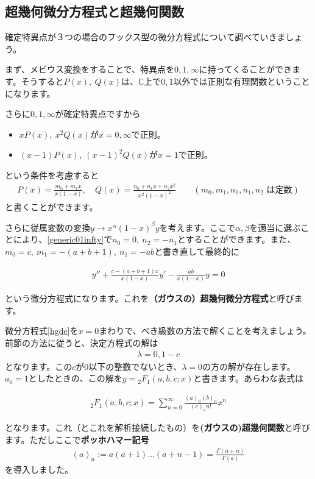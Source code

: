 \documentclass[report,paper=a4, fontsize=12pt, line_length=16cm, number_of_lines=33,dvipdfmx]{jlreq}
\newenvironment{important}{\begin{tcolorbox}[
  colback = white,
  colframe = red!35,
  boxrule = 2mm,
  fonttitle = \bfseries,
  after = \noindent] }{\end{tcolorbox}}
\numberwithin{equation}{section}
\newcommand{\Cb}{\mathbb{C}}
\newcommand{\strong}[1]{\textsf{\bfseries #1}}
\newcommand{\HG}{{}_2F_1}
\begin{document}
\subsection{超幾何微分方程式と超幾何関数}
確定特異点が３つの場合のフックス型の微分方程式について調べていきましょう。

まず、メビウス変換をすることで、特異点を$0,1,\infty$に持ってくることができます。そうすると$P(x),\ Q(x)$は、$\Cb$上で$0,1$以外では正則な有理関数ということになります。

さらに$0,1,\infty$が確定特異点ですから
\begin{itemize}
  \item $xP(x),\ x^2 Q(x)$が$x=0,\infty$で正則。
  \item $(x-1)P(x),\ (x-1)^2Q(x)$が$x=1$で正則。
\end{itemize}
という条件を考慮すると
\begin{align}
  P(x)=\frac{m_0+m_1 x}{x(1-x)},\quad
  Q(x)=\frac{n_0+n_1x+n_2 x^2}{x^2(1-x)^2}
  \qquad (m_0,m_1,n_0,n_1,n_2 \text{ は定数})\label{generic01infty}
\end{align}
と書くことができます。

さらに従属変数の変換$y\to x^{\alpha}(1-x)^{\beta}y$を考えます。ここで$\alpha,\beta$を適当に選ぶことにより、\eqref{generic01infty}で$n_0=0,\ n_2=-n_1$とすることができます。また、$m_0=c,\ m_1=-(a+b+1),\ n_1=-ab$と書き直して最終的に
\begin{important}
  \begin{align}
    y''+\frac{c-(a+b+1)x}{x(1-x)}y'-\frac{ab}{x(1-x)}y=0\label{hgde}
  \end{align}    
\end{important}
という微分方程式になります。これを\strong{（ガウスの）超幾何微分方程式}と呼びます。

微分方程式\eqref{hgde}を$x=0$まわりで、べき級数の方法で解くことを考えましょう。前節の方法に従うと、決定方程式の解は
\begin{align}
  \lambda=0,1-c
\end{align}
となります。この$c$が$0$以下の整数でないとき、$\lambda=0$の方の解が存在します。$a_0=1$としたときの、この解を$y=\HG(a,b,c;x)$と書きます。あらわな表式は
\begin{important}
  \begin{align}
    \HG(a,b,c;x)=\sum_{n=0}^{\infty}\frac{(a)_n(b)_n}{(c)_n n!} x^n\label{hgf}
  \end{align}
\end{important}
となります。これ（とこれを解析接続したもの）を\strong{(ガウスの)超幾何関数}と呼びます。ただしここで\strong{ポッホハマー記号}
\begin{align}
  (a)_n:=a(a+1)\dots (a+n-1)=\frac{\Gamma(a+n)}{\Gamma(a)}
\end{align}
を導入しました。
\end{document}
